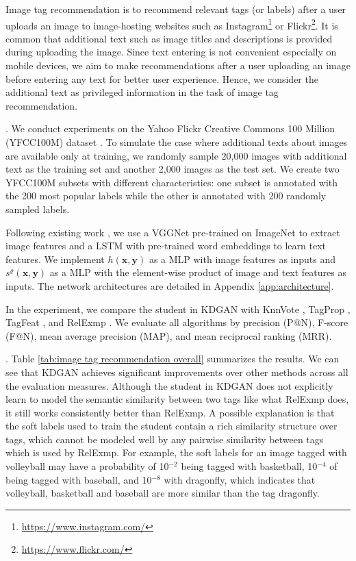 \documentclass{article}
\newcommand{\OVEC}[1]{\bm{#1}} %
\newcommand{\stdscore}{h(\OVEC{x},\OVEC{y})}
\newcommand{\priscore}[1]{s^{\varrho}_{#1}(\OVEC{x},\OVEC{y})}
\begin{document}
Image tag recommendation is to recommend relevant tags (or labels) after a user uploads an image to image-hosting websites such as Instagram\footnote{\url{https://www.instagram.com/}} or Flickr\footnote{\url{https://www.flickr.com/}}.
It is common that additional text such as image titles and descriptions is provided during uploading the image.
Since text entering is not convenient especially on mobile devices, we aim to make recommendations after a user uploading an image before entering any text for better user experience.
Hence, we consider the additional text as privileged information in the task of image tag recommendation.


.
We conduct experiments on the Yahoo Flickr Creative Commons 100 Million (YFCC100M) dataset \cite{thomee2016yfcc100m}.
To simulate the case where additional texts about images are available only at training, we randomly sample 20,000 images with additional text as the training set and another 2,000 images as the test set.
We create two YFCC100M subsets with different characteristics: one subset is annotated with the 200 most popular labels while the other is annotated with 200 randomly sampled labels.

Following existing work \cite{antol2015vqa}, we use a VGGNet \cite{simonyan2014very} pre-trained on ImageNet \cite{deng2009imagenet} to extract image features and a LSTM \cite{hochreiter1997long} with pre-trained word embeddings \cite{mikolov2013distributed} to learn text features.
We implement $\stdscore$ as a MLP with image features as inputs and $\priscore{}$ as a MLP with the element-wise product of image and text features as inputs.
The network architectures are detailed in Appendix \ref{app:architecture}.

In the experiment, we compare the student in KDGAN with KnnVote \cite{makadia2010baselines}, TagProp \cite{guillaumin2009tagprop}, TagFeat \cite{chen2012tag}, and RelExmp \cite{li2013classifying}.
We evaluate all algorithms by precision (P@N), F-score (F@N), mean average precision (MAP), and mean reciprocal ranking (MRR).

.
Table \ref{tab:image tag recommendation overall} summarizes the results.
We can see that KDGAN achieves significant improvements over other methods across all the evaluation measures.
Although the student in KDGAN does not explicitly learn to model the semantic similarity between two tags like what RelExmp does, it still works consistently better than RelExmp.
A possible explanation is that the soft labels used to train the student contain a rich similarity structure over tags, which cannot be modeled well by any pairwise similarity between tags which is used by RelExmp.
For example, the soft labels for an image tagged with volleyball may have a probability of 10$^{-2}$ being tagged with basketball, 10$^{-4}$ of being tagged with baseball, and 10$^{-8}$ with dragonfly, which indicates that volleyball, basketball and baseball are more similar than the tag dragonfly.
\end{document}
